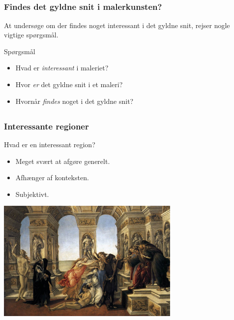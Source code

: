 \documentclass[xcolor=table]{beamer}
\begin{document}
\subsection*{}
\begin{frame}

    \frametitle{Findes det gyldne snit i malerkunsten?}

    At undersøge om der findes noget interessant i det gyldne snit,
    rejser nogle vigtige spørgsmål.

    \hspace{8em}

    \begin{block}{Spørgsmål}

        \begin{itemize}
            \item Hvad er \emph{interessant} i maleriet?
            \item Hvor \emph{er} det gyldne snit i et maleri?
            \item Hvornår \emph{findes} noget i det gyldne snit?
        \end{itemize}

    \end{block}

\end{frame}

\subsection*{}
\begin{frame}

    \frametitle{Interessante regioner}

    \begin{block}{Hvad er en interessant region?}
        \begin{itemize}
            \item Meget svært at afgøre generelt.
            \item Afhænger af konteksten.
            \item Subjektivt.
        \end{itemize}
    \end{block}

    \begin{center}
        \includegraphics[width=0.67\textwidth]{billeder/10calumn.jpg}
    \end{center}

\end{frame}
\end{document}
